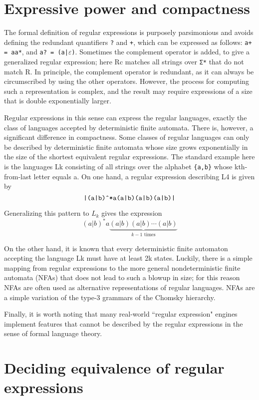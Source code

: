 \section{Expressive power and compactness}

The formal definition of regular expressions is purposely parsimonious and avoids defining the redundant quantifiers \texttt{?} and \texttt{+}, which can be expressed as follows: \texttt{a+ = aa*}, and \texttt{a? = (a|$\varepsilon$)}. Sometimes the complement operator is added, to give a generalized regular expression; here Rc matches all strings over \texttt{Σ*} that do not match R. In principle, the complement operator is redundant, as it can always be circumscribed by using the other operators. However, the process for computing such a representation is complex, and the result may require expressions of a size that is double exponentially larger.

Regular expressions in this sense can express the regular languages, exactly the class of languages accepted by deterministic finite automata. There is, however, a significant difference in compactness. Some classes of regular languages can only be described by deterministic finite automata whose size grows exponentially in the size of the shortest equivalent regular expressions. The standard example here is the languages Lk consisting of all strings over the alphabet \texttt{\{a,b\}} whose kth-from-last letter equals a. On one hand, a regular expression describing L4 is given by $$\text{\texttt{|(a|b)\^{}*a(a|b)(a|b)(a|b)|}}$$


Generalizing this pattern to $L_k$ gives the expression$$(a|b)^*a\underbrace{(a|b)(a|b)\cdots(a|b)}_{k-1\text{  times}}$$

On the other hand, it is known that every deterministic finite automaton accepting the language Lk must have at least 2k states. Luckily, there is a simple mapping from regular expressions to the more general nondeterministic finite automata (NFAs) that does not lead to such a blowup in size; for this reason NFAs are often used as alternative representations of regular languages. NFAs are a simple variation of the type-3 grammars of the Chomsky hierarchy.

Finally, it is worth noting that many real-world ``regular expression" engines implement features that cannot be described by the regular expressions in the sense of formal language theory.




\section{Deciding equivalence of regular expressions}

